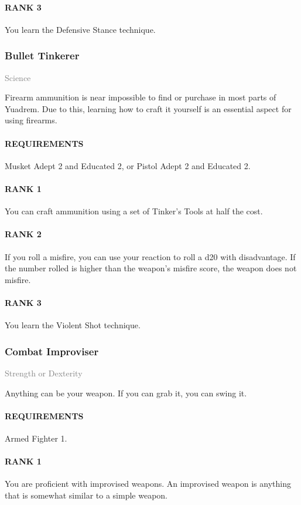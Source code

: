 \paragraph{RANK 3} You learn the Defensive Stance technique.

\subsubsection{Bullet Tinkerer} \label{feat::bullettinkerer}
\small{\textcolor{gray}{Science}}

\normalsize
Firearm ammunition is near impossible to find or purchase in most parts of Yuadrem.
Due to this, learning how to craft it yourself is an essential aspect for using firearms.
\paragraph{REQUIREMENTS} Musket Adept 2 and Educated 2, or Pistol Adept 2 and Educated 2.
\paragraph{RANK 1} You can craft ammunition using a set of Tinker's Tools at half the cost.
\paragraph{RANK 2} If you roll a misfire, you can use your reaction to roll a d20 with disadvantage.
If the number rolled is higher than the weapon's misfire score, the weapon does not misfire.
\paragraph{RANK 3} You learn the Violent Shot technique.
\subsubsection{Combat Improviser} \label{feat::combatimproviser}
\small{\textcolor{gray}{Strength or Dexterity}}

\normalsize
Anything can be your weapon.
If you can grab it, you can swing it.
\paragraph{REQUIREMENTS} Armed Fighter 1.
\paragraph{RANK 1} You are proficient with improvised weapons.
An improvised weapon is anything that is somewhat similar to a simple weapon.

